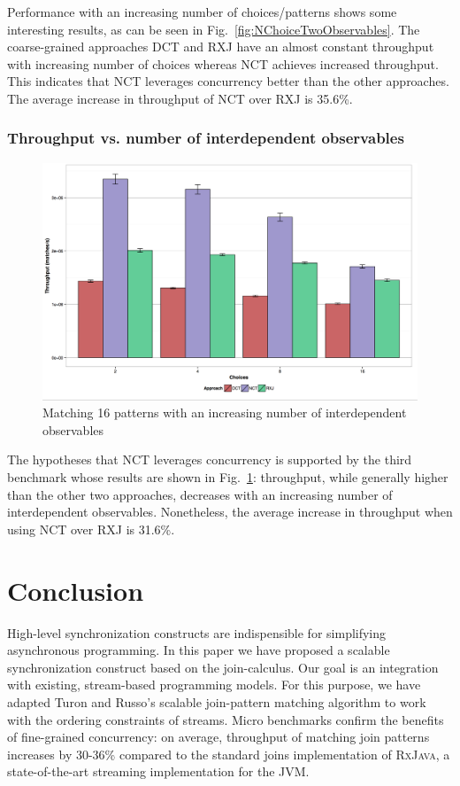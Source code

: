 \documentclass[runningheads]{llncs}
\begin{document}
\begin{sloppypar}
Performance with an increasing number of choices/patterns shows some
interesting results, as can be seen in Fig.~\ref{fig:NChoiceTwoObservables}.
The coarse-grained approaches DCT and RXJ have an almost constant throughput
with increasing number of choices whereas NCT achieves increased throughput.
This indicates that NCT leverages concurrency better than the other
approaches. The average increase in throughput of NCT over RXJ is 35.6\%.

\subsubsection{Throughput vs. number of interdependent observables}

\begin{figure}[h]
  \centering
  \includegraphics[scale=0.30]{img/32-patterns-N-interdep.pdf}
  \caption{Matching 16 patterns with an increasing number of interdependent observables}
  \label{fig:interdependent}
\end{figure}

The hypotheses that NCT leverages concurrency is supported by the third
benchmark whose results are shown in Fig.~\ref{fig:interdependent}:
throughput, while generally higher than the other two approaches, decreases
with an increasing number of interdependent observables. Nonetheless, the average
increase in throughput when using NCT over RXJ is 31.6\%.


\section{Conclusion}\label{sec:conclusion}

High-level synchronization constructs are indispensible for simplifying
asynchronous programming. In this paper we have proposed a scalable
synchronization construct based on the join-calculus. Our goal is an
integration with existing, stream-based programming models. For this purpose,
we have adapted Turon and Russo's scalable join-pattern matching algorithm to
work with the ordering constraints of streams. Micro benchmarks confirm the
benefits of fine-grained concurrency: on average, throughput of matching join
patterns increases by 30-36\% compared to the standard joins implementation of
\textsc{RxJava}, a state-of-the-art streaming implementation for the JVM.





\end{sloppypar}
\end{document}

